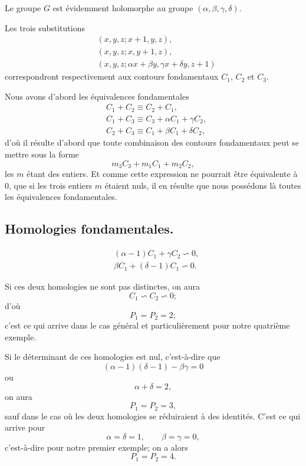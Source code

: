 \documentclass{article}
\begin{document}
Le groupe $G$ est évidemment holomorphe au groupe $(\alpha, \beta, \gamma, \delta)$.

Les trois substitutions
\[ \begin{aligned} &(x, y, z; x + 1, y, z),\\ &(x, y, z; x, y + 1, z),\\ &(x, y, z; \alpha x + \beta y, \gamma x + \delta y, z + 1) \end{aligned} \]
correspondront respectivement aux contours fondamentaux $C_{1}$, $C_{2}$ et $C_{3}$.

Nous avons d'abord les équivalences fondamentales
\[ \begin{aligned} &C_{1} + C_{2} \equiv C_{2} + C_{1},\\ &C_{1} + C_{3} \equiv C_{3} + \alpha C_{1} + \gamma C_{2},\\ &C_{2} + C_{3} \equiv C_{1} + \beta C_{1} + \delta C_{2}, \end{aligned} \]
d'où il résulte d'abord que toute combinaison des contours fondamentaux peut se mettre sous la forme
\[ m_{3}C_{3} + m_{1}C_{1} + m_{2}C_{2}, \]
les $m$ étant des entiers. Et comme cette expression ne pourrait être équivalente à 0, que si les trois entiers $m$ étaient nuls, il en résulte que nous possédons là toutes les équivalences fondamentales.

\subsection*{Homologies fondamentales.}

\[ \begin{aligned} &(\alpha - 1)C_{1} + \gamma C_{2} \backsim 0,\\ &\beta C_{1} + (\delta - 1) C_{1} \backsim 0. \end{aligned} \]

Si ces deux homologies ne sont pas distinctes, on aura
\[ C_{1} \backsim C_{2} \backsim 0; \]
d'où
\[ P_{1} = P_{2} = 2; \]
c'est ce qui arrive dans le cas général et particulièrement pour notre quatrième exemple.

Si le déterminant de ces homologies est nul, c'est-à-dire que
\[ (\alpha - 1)(\delta - 1) - \beta\gamma = 0 \]
ou
\[ \alpha + \delta = 2, \]
on aura
\[ P_{1} = P_{2} = 3, \]
sauf dans le cas où les deux homologies se réduiraient à des identités. C'est ce qui arrive pour
\[ \alpha = \delta = 1, \qquad \beta = \gamma = 0, \]
c'est-à-dire pour notre premier exemple; on a alors
\[ P_{1} = P_{2} = 4. \]
\end{document}
